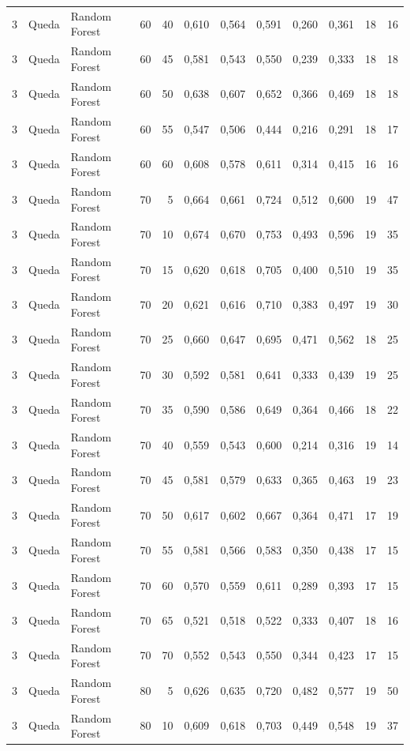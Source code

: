 \begin{longtable}{@{}rllrrrrrrrrr@{}}
3 & Queda & Random Forest & 60 & 40 & 0,610 & 0,564 & 0,591 & 0,260 & 0,361 & 18 & 16 \\
3 & Queda & Random Forest & 60 & 45 & 0,581 & 0,543 & 0,550 & 0,239 & 0,333 & 18 & 18 \\
3 & Queda & Random Forest & 60 & 50 & 0,638 & 0,607 & 0,652 & 0,366 & 0,469 & 18 & 18 \\
3 & Queda & Random Forest & 60 & 55 & 0,547 & 0,506 & 0,444 & 0,216 & 0,291 & 18 & 17 \\
3 & Queda & Random Forest & 60 & 60 & 0,608 & 0,578 & 0,611 & 0,314 & 0,415 & 16 & 16 \\
3 & Queda & Random Forest & 70 & 5 & 0,664 & 0,661 & 0,724 & 0,512 & 0,600 & 19 & 47 \\
3 & Queda & Random Forest & 70 & 10 & 0,674 & 0,670 & 0,753 & 0,493 & 0,596 & 19 & 35 \\
3 & Queda & Random Forest & 70 & 15 & 0,620 & 0,618 & 0,705 & 0,400 & 0,510 & 19 & 35 \\
3 & Queda & Random Forest & 70 & 20 & 0,621 & 0,616 & 0,710 & 0,383 & 0,497 & 19 & 30 \\
3 & Queda & Random Forest & 70 & 25 & 0,660 & 0,647 & 0,695 & 0,471 & 0,562 & 18 & 25 \\
3 & Queda & Random Forest & 70 & 30 & 0,592 & 0,581 & 0,641 & 0,333 & 0,439 & 19 & 25 \\
3 & Queda & Random Forest & 70 & 35 & 0,590 & 0,586 & 0,649 & 0,364 & 0,466 & 18 & 22 \\
3 & Queda & Random Forest & 70 & 40 & 0,559 & 0,543 & 0,600 & 0,214 & 0,316 & 19 & 14 \\
3 & Queda & Random Forest & 70 & 45 & 0,581 & 0,579 & 0,633 & 0,365 & 0,463 & 19 & 23 \\
3 & Queda & Random Forest & 70 & 50 & 0,617 & 0,602 & 0,667 & 0,364 & 0,471 & 17 & 19 \\
3 & Queda & Random Forest & 70 & 55 & 0,581 & 0,566 & 0,583 & 0,350 & 0,438 & 17 & 15 \\
3 & Queda & Random Forest & 70 & 60 & 0,570 & 0,559 & 0,611 & 0,289 & 0,393 & 17 & 15 \\
3 & Queda & Random Forest & 70 & 65 & 0,521 & 0,518 & 0,522 & 0,333 & 0,407 & 18 & 16 \\
3 & Queda & Random Forest & 70 & 70 & 0,552 & 0,543 & 0,550 & 0,344 & 0,423 & 17 & 15 \\
3 & Queda & Random Forest & 80 & 5 & 0,626 & 0,635 & 0,720 & 0,482 & 0,577 & 19 & 50 \\
3 & Queda & Random Forest & 80 & 10 & 0,609 & 0,618 & 0,703 & 0,449 & 0,548 & 19 & 37 \\

\end{longtable}
